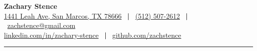 \documentclass[letterpaper, 10pt]{article}
\newcommand{\sep}{\ \textbf{|} \ }
\begin{document}
\begin{NoHyper}



%
%


\textbf{\huge Zachary Stence} \\[2pt]
\href{https://goo.gl/maps/5kUt8MF8fhMqY8UM9}{1441 Leah Ave, San Marcos, TX 78666} \sep    \href{tel:15125072612}{(512) 507-2612} \sep \href{mailto:zachstence@gmail.com}{zachstence@gmail.com} \\
\href{https://www.linkedin.com/in/zachary-stence}{linkedin.com/in/zachary-stence} \sep  \href{https://www.github.com/zachstence}{github.com/zachstence} \\[6pt]

\hrule
\vspace{2pt}

%
%





\end{NoHyper}
\end{document}
